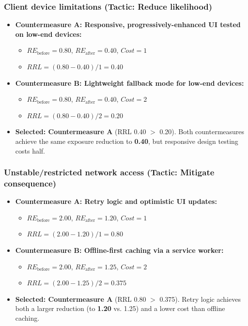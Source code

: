 \documentclass[11pt]{article}
\begin{document}
\subsubsection*{Client device limitations (Tactic: Reduce likelihood)}
\begin{itemize}[leftmargin=1.5em]
  \item \textbf{Countermeasure A: Responsive, progressively-enhanced UI tested on low-end devices:}
  \begin{itemize}[leftmargin=1.5em]
    \item $RE_{\text{before}} = 0.80$, $RE_{\text{after}} = 0.40$, $Cost = 1$
    \item $RRL = (0.80 - 0.40) / 1 = 0.40$
  \end{itemize}
  \item \textbf{Countermeasure B: Lightweight fallback mode for low-end devices:}
  \begin{itemize}[leftmargin=1.5em]
    \item $RE_{\text{before}} = 0.80$, $RE_{\text{after}} = 0.40$, $Cost = 2$
    \item $RRL = (0.80 - 0.40) / 2 = 0.20$
  \end{itemize}
  \item \textbf{Selected: Countermeasure A} (RRL 0.40 $>$ 0.20). Both countermeasures achieve the same exposure reduction to \textbf{0.40}, but responsive design testing costs half.
\end{itemize}

\subsubsection*{Unstable/restricted network access (Tactic: Mitigate consequence)}
\begin{itemize}[leftmargin=1.5em]
  \item \textbf{Countermeasure A: Retry logic and optimistic UI updates:}
  \begin{itemize}[leftmargin=1.5em]
    \item $RE_{\text{before}} = 2.00$, $RE_{\text{after}} = 1.20$, $Cost = 1$
    \item $RRL = (2.00 - 1.20) / 1 = 0.80$
  \end{itemize}
  \item \textbf{Countermeasure B: Offline-first caching via a service worker:}
  \begin{itemize}[leftmargin=1.5em]
    \item $RE_{\text{before}} = 2.00$, $RE_{\text{after}} = 1.25$, $Cost = 2$
    \item $RRL = (2.00 - 1.25) / 2 = 0.375$
  \end{itemize}
  \item \textbf{Selected: Countermeasure A} (RRL 0.80 $>$ 0.375). Retry logic achieves both a larger reduction (to \textbf{1.20} vs. 1.25) and a lower cost than offline caching.
\end{itemize}
\end{document}
